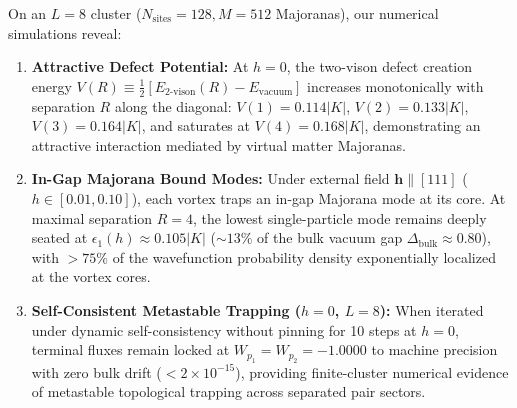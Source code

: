 On an $L = 8$ cluster ($N_{\mathrm{sites}} = 128, M = 512$ Majoranas), our numerical simulations reveal:
\begin{enumerate}
\item \textbf{Attractive Defect Potential:} At $h = 0$, the two-vison defect creation energy $V(R) \equiv \frac{1}{2}[E_{\mathrm{2\text{-}vison}}(R) - E_{\mathrm{vacuum}}]$ increases monotonically with separation $R$ along the diagonal: $V(1) = 0.114 |K|$, $V(2) = 0.133 |K|$, $V(3) = 0.164 |K|$, and saturates at $V(4) = 0.168 |K|$, demonstrating an attractive interaction mediated by virtual matter Majoranas.
\item \textbf{In-Gap Majorana Bound Modes:} Under external field $\mathbf{h} \parallel [111]$ ($h \in [0.01, 0.10]$), each vortex traps an in-gap Majorana mode at its core. At maximal separation $R = 4$, the lowest single-particle mode remains deeply seated at $\epsilon_1(h) \approx 0.105 |K|$ ($\sim 13\%$ of the bulk vacuum gap $\Delta_{\mathrm{bulk}} \approx 0.80$), with $>75\%$ of the wavefunction probability density exponentially localized at the vortex cores.
\item \textbf{Self-Consistent Metastable Trapping ($h=0$, $L=8$):} When iterated under dynamic self-consistency without pinning for 10 steps at $h=0$, terminal fluxes remain locked at $W_{p_1} = W_{p_2} = -1.0000$ to machine precision with zero bulk drift ($< 2 \times 10^{-15}$), providing finite-cluster numerical evidence of metastable topological trapping across separated pair sectors.
\end{enumerate}
